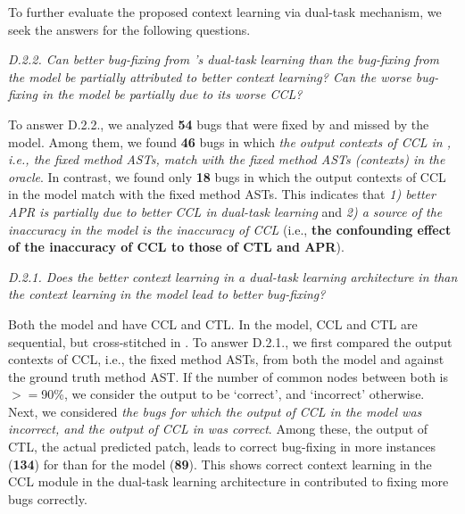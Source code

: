 To further evaluate the proposed context learning via dual-task
mechanism, we  seek the answers for the following questions.

{\em D.2.2. Can better bug-fixing from {\tool}'s dual-task
  learning than the bug-fixing from the  model be
  partially attributed to better context learning? Can the worse bug-fixing in the  model be partially due to its worse CCL?}


To answer D.2.2., we analyzed {\bf 54} bugs that were fixed by
{\tool} and missed by the  model. Among them, we found
{\bf 46} bugs in which {\em the output contexts of CCL in {\tool},
  i.e., the fixed method ASTs, match with the fixed method ASTs
  (contexts) in the oracle}. In contrast, we found only {\bf 18} bugs
in which the output contexts of CCL in the  model
match with the fixed method ASTs.
%
This indicates that {\em 1) better APR is partially due to better
  CCL in dual-task learning} and {\em 2) a source
  of the inaccuracy in the  model is the inaccuracy of
  CCL} (i.e., {\bf the confounding effect of the inaccuracy of CCL to those of CTL and APR}).

{\em D.2.1. Does the better context learning in a dual-task learning
  architecture in {\tool} than the context learning in the
   model lead to better bug-fixing?}

Both the  model and {\tool} have CCL and CTL. In the
 model, CCL and CTL are sequential, but cross-stitched
in {\tool}. To answer D.2.1., we first compared the output contexts of
CCL, i.e., the fixed method ASTs, from both the  model
and {\tool} against the ground truth method AST. If the number of
common nodes between both is$>=$90\%, we consider the output to be
`correct', and `incorrect' otherwise. Next, we considered {\em the
  bugs for which the output of CCL in the  model was
  incorrect, and the output of CCL in {\tool} was correct}. Among
these, the output of CTL, the actual predicted patch, leads to correct
bug-fixing in more instances ({\bf 134}) for {\tool} than for the
 model ({\bf 89}). This shows correct context learning
in the CCL module in the dual-task learning architecture in {\tool}
contributed to fixing more bugs correctly.

